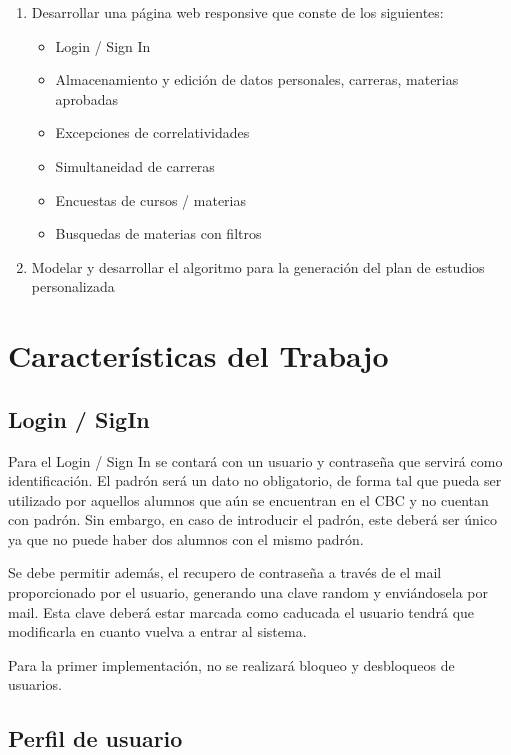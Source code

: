 \documentclass[a4paper]{article}
\begin{document}
\begin{enumerate}
	\item Desarrollar una página web responsive que conste de los siguientes:
		\begin{itemize}
			\item Login / Sign In
			\item Almacenamiento y edición de datos personales, carreras, materias aprobadas
			\item Excepciones de correlatividades
			\item Simultaneidad de carreras
			\item Encuestas de cursos / materias
			\item Busquedas de materias con filtros
		\end{itemize}
		
	\item Modelar y desarrollar el algoritmo para la generación del plan de estudios personalizada
\end{enumerate}

\section{Características del Trabajo}

\subsection{Login / SigIn}

Para el Login / Sign In se contará con un usuario y contraseña que servirá como identificación. El padrón será un dato no obligatorio, de forma tal que pueda ser utilizado por aquellos alumnos que aún se encuentran en el CBC y no cuentan con padrón. Sin embargo, en caso de introducir el padrón, este deberá ser único ya que no puede haber dos alumnos con el mismo padrón.

Se debe permitir además, el recupero de contraseña a través de el mail proporcionado por el usuario, generando una clave random y enviándosela por mail. Esta clave deberá estar marcada como caducada  el usuario tendrá que modificarla en cuanto vuelva a entrar al sistema.

Para la primer implementación, no se realizará bloqueo y desbloqueos de usuarios.

\subsection{Perfil de usuario}
\end{document}
